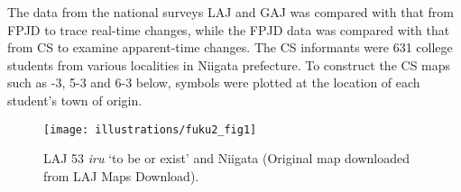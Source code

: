 \documentclass[output=paper]{LSP/langsci}
\begin{document}
\begin{table}
\caption{A comparison of characteristics of four surveys}\label{tab:1}
\end{table}

The data from the national surveys LAJ and GAJ was compared with that from FPJD to trace real-time changes, while the FPJD data was compared with that from CS to examine apparent-time changes.  The CS informants were 631 college students from various localities in Niigata prefecture. To construct the CS maps such as -3, 5-3 and 6-3 below, symbols were plotted at the location of each student's town of origin.

\begin{figure}
\texttt{[image: illustrations/fuku2\_fig1]}
\caption{LAJ 53 \textit{iru} `to be or exist' and Niigata (Original map downloaded from LAJ Maps Download).}
\label{fig:1}
\end{figure}
\end{document}
